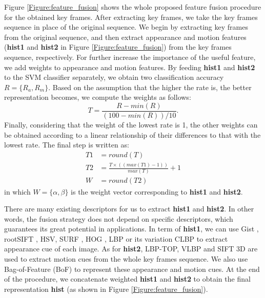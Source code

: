 \documentclass[5p]{elsarticle}
\begin{document}
Figure \ref{Figure:feature_fusion} shows the whole proposed feature fusion procedure for the obtained key frames.
After extracting key frames, we take the key frames sequence in place of the original sequence.
We begin by extracting key frames from the original sequence, and then extract appearance and motion features (\textbf{hist1} and \textbf{hist2} in Figure \ref{Figure:feature_fusion}) from the key frames sequence, respectively.
For further increase the importance of the useful feature, we add weights to appearance and motion features.
By feeding \textbf{hist1} and \textbf{hist2} to the SVM classifier separately, we obtain two classification accuracy $R = \{R_a, R_m\}$.
Based on the assumption that the higher the rate is, the better representation becomes, we compute the weights as follows:
\begin{equation}
T = \frac{R - min(R)}{(100 - min(R))/10}.
\label{equ:t}
\end{equation}
Finally, considering that the weight of the lowest rate is 1, the other weights can be obtained according to a linear relationship of their differences to that with the lowest rate.
The final step is written as:
\begin{equation}
\begin{aligned}
T1 &= round(T)\\
T2 &= \frac{T \times ((max(T1)-1))}{max(T)} + 1 \\
W  &= round(T2)
\end{aligned}
\label{equ:f}
\end{equation}
in which $W= \{\alpha, \beta\}$ is the weight vector corresponding to \textbf{hist1} and \textbf{hist2}.

There are many existing descriptors for us to extract \textbf{hist1} and \textbf{hist2}.
In other words, the fusion strategy does not depend on specific descriptors, which guarantees its great potential in applications.
In term of \textbf{hist1}, we can use Gist \cite{oliva2001modeling}, rootSIFT \cite{arandjelovic2012three}, HSV, SURF \cite{bay2006surf}, HOG \cite{dalal2005histograms}, LBP \cite{ojala2002multiresolution} or its variation CLBP \cite{guo2010completed} to extract appearance cue of each image.
As for \textbf{hist2}, LBP-TOP, VLBP \cite{zhao2007dynamic} and SIFT 3D \cite{scovanner20073} are used to extract motion cues from the whole key frames sequence.
We also use Bag-of-Feature (BoF) \cite{liu2016sequential,dardas2011real} to represent these appearance and motion cues.
At the end of the procedure, we concatenate weighted \textbf{hist1} and \textbf{hist2} to obtain the final representation \textbf{hist} (as shown in Figure \ref{Figure:feature_fusion}).
\end{document}
